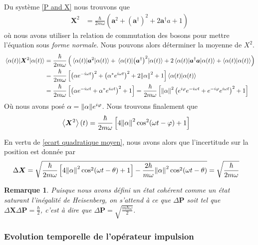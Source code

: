 \documentclass[11pt,oneside,a4paper]{article}
\newcommand{\h}{\ensuremath{\hbar}}
\newtheorem{remark}[theorem]{Remarque}
\begin{document}
Du système \eqref{P and X} nous trouvons que 
\begin{align*}
  \bm{X}^2 &= \frac{\h}{2m\omega}\left(\bm{a}^2+\left(\bm{a}^\dagger\right)^2+2\bm{a}^\dagger a+1\right)
\end{align*}
où nous avons utiliser la relation de commutation des bosons pour mettre l'équation sous \emph{forme normale}. Nous pouvons alors déterminer la moyenne de $X^2$.
\begin{align}
  \expval{\bm{X}^2}{\alpha(t)} &= \frac{\h}{2m\omega} \left(\expval{\bm{a}^2}{\alpha(t)}+\expval{\left(\bm{a}^\dagger\right)^2}{\alpha(t)}+2\expval{\bm{a}^\dagger \bm{a}}{\alpha(t)}+\braket{\alpha(t)}\right)\notag\\
  &= \frac{\h}{2m\omega}\left[\left(\alpha e^{-i\omega t}\right)^2+\left(\alpha^*e^{i\omega t}\right)^2 +2\norm{\alpha}^2+1\right]\braket{\alpha(t)}\notag\\
  &= \frac{\h}{2m\omega}\left[\left(\alpha e^{-i\omega t}+\alpha^*e^{i\omega t}\right)^2+1\right] = \frac{\h}{2m\omega}\left[\norm{\alpha}^2\left(e^{i\varphi}e^{-i\omega t}+e^{-i\varphi}e^{i\omega t}\right)^2+1\right]\notag
\end{align}
Où nous avons posé $\alpha = \norm{\alpha}e^{i\varphi}$. Nous trouvons finalement que 
\begin{align}
  \expval{\bm{X}^2}(t) &= \frac{\h}{2m\omega}\left[4\norm{\alpha}^2\cos^2(\omega t-\varphi)+1\right]\label{Mean X^2}
\end{align}

En vertu de \eqref{ecart quadratique moyen}, nous avons alors que l'incertitude sur la position est donnée par
\begin{align}
  \Delta \bm{X} &= \sqrt{\frac{\h}{2m\omega}\left[4\norm{\alpha}^2\cos^2(\omega t-\theta)+1\right] - \frac{2\h}{m\omega}\norm{\alpha}^2\cos^2(\omega t-\theta)} = \sqrt{\frac{\h}{2m\omega}}
\end{align}

\begin{remark}
  Puisque nous avons défini un état cohérent comme un état saturant l'inégalité de Heisenberg, on s'attend à ce que $\Delta \bm{P}$ soit tel que $\Delta \bm{X}\Delta \bm{P} = \frac{\h}{2}$, c'est à dire que $\Delta \bm{P} = \sqrt{\frac{m\h\omega}{2}}$.
\end{remark}

\subsubsection{Evolution temporelle de l'opérateur impulsion}
\label{Evolution temporelle de l'opérateur impulsion}
\end{document}
